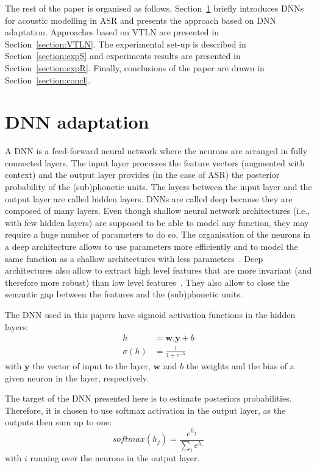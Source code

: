 \documentclass{nle}
\begin{document}
The    rest    of    the    paper    is    organised    as    follows,
Section~\ref{section:DNN}   briefly   introduces   DNNs  for   acoustic
modelling   in   ASR  and   presents   the   approach   based  on   DNN
adaptation.    Approaches   based   on    VTLN   are    presented   in
Section~\ref{section:VTLN}.  The experimental  set-up  is described  in
Section~\ref{section:expS}  and experiments  results are  presented in
Section~\ref{section:expR}.  Finally,  conclusions  of the  paper  are
drawn in Section~\ref{section:concl}.

\section{DNN adaptation}\label{section:DNN}
A DNN is a feed-forward neural network where the neurons are arranged in fully connected layers. The input layer processes the feature vectors (augmented with context) and the output layer provides (in the case of ASR) the posterior probability of the (sub)phonetic units. The layers between the input layer and the output layer are called hidden layers. DNNs are called deep because they are composed of many layers. Even though shallow neural network architectures (i.e., with few hidden layers) are supposed to be able to model any function, they may require a huge number of parameters to do so. The organisation of the neurons in a deep architecture allows to use parameters more efficiently and to model the same function as a shallow architectures with less parameters~\citep*{bengio2013representation}. Deep architectures also allow to extract high level features that are more invariant (and therefore more robust) than low level features~\citep{hinton12}. They also allow to close the semantic gap between the features and the (sub)phonetic units. 

The DNN used in this papers have sigmoid activation functions in the hidden layers:
\begin{align}
h & = \textbf{w}.\textbf{y} + b \nonumber\\
  \sigma(h) & = \frac{1}{1+ e^{-h} }\nonumber
\end{align}
with $\textbf{y}$ the vector of input to the layer,  $\textbf{w}$ and $b$ the weights and the bias of a given neuron in  the layer, respectively.

The target of the DNN presented here is to estimate posteriors probabilities. Therefore, it is chosen to use softmax activation in the output layer, as the outputs then sum up to one:
\begin{equation}
 softmax(h_j)=\frac{e^{h_j}}{\sum\limits_i e^{h_i}}\nonumber
\end{equation}
with $i$ running over the neurons in the output layer.
\end{document}
